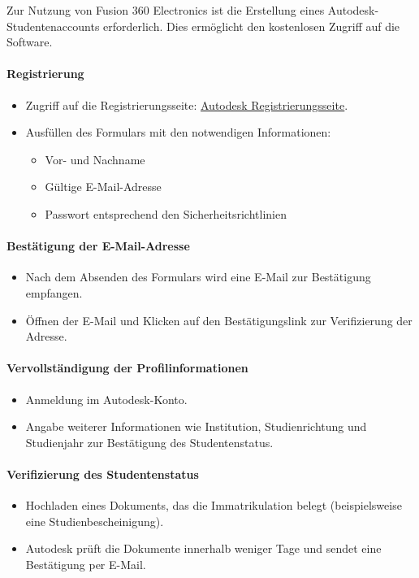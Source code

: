 Zur Nutzung von Fusion 360 Electronics ist die Erstellung eines Autodesk-Studentenaccounts erforderlich. Dies ermöglicht den kostenlosen Zugriff auf die Software.

\paragraph{ Registrierung}
\begin{itemize}
	\item Zugriff auf die Registrierungsseite: \href{https://accounts.autodesk.com/register?resume=/as/fMRyxxIM12/resume/as/authorization.ping&ack=uWlmiJuqQqVaAQjGdojc8Qxit4KVdorZ}{\underline{Autodesk Registrierungsseite}}.
	\item Ausfüllen des Formulars mit den notwendigen Informationen:
	\begin{itemize}
		\item Vor- und Nachname
		\item Gültige E-Mail-Adresse
		\item Passwort entsprechend den Sicherheitsrichtlinien
	\end{itemize}
\end{itemize}

\paragraph{ Bestätigung der E-Mail-Adresse}
\begin{itemize}
	\item Nach dem Absenden des Formulars wird eine E-Mail zur Bestätigung empfangen.
	\item Öffnen der E-Mail und Klicken auf den Bestätigungslink zur Verifizierung der Adresse.
\end{itemize}

\paragraph{ Vervollständigung der Profilinformationen}
\begin{itemize}
	\item Anmeldung im Autodesk-Konto.
	\item Angabe weiterer Informationen wie Institution, Studienrichtung und Studienjahr zur Bestätigung des Studentenstatus.
\end{itemize}

\paragraph*{ Verifizierung des Studentenstatus}
\begin{itemize}
	\item Hochladen eines Dokuments, das die Immatrikulation belegt (beispielsweise eine Studienbescheinigung).
	\item Autodesk prüft die Dokumente innerhalb weniger Tage und sendet eine Bestätigung per E-Mail.
\end{itemize}

